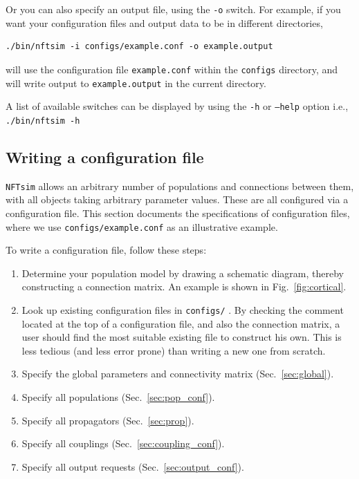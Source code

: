 \documentclass[12pt,a4paper]{article}
\newcommand{\type}[1]{{\small\small\tt #1} }
\newcommand{\NF}[0]{\type{NFTsim}}
\begin{document}
Or you can also specify an output file, using the \type{-o} switch. For example, if you want your configuration files and output data to be in different directories,

\begin{lstlisting}
./bin/nftsim -i configs/example.conf -o example.output
\end{lstlisting}

will use the configuration file \type{example.conf} within the \type{configs} directory, and will write output to \type{example.output} in the current directory.

A list of available switches can be displayed by using the \type{-h} or \type{--help} option i.e., \type{./bin/nftsim -h}

\subsection{Writing a configuration file}
\label{sec:config}

\NF allows an arbitrary number of populations and connections between them, with all objects taking arbitrary parameter values. These are all configured via a configuration file. This section documents the specifications of configuration files, where we use \type{configs/example.conf} as an illustrative example.

To write a configuration file, follow these steps:
\begin{enumerate}
\item Determine your population model by drawing a schematic diagram, thereby constructing a connection matrix. An example is shown in Fig.~\ref{fig:cortical}.
\item Look up existing configuration files in \type{configs/}. By checking the comment located at the top of a configuration file, and also the connection matrix, a user should find the most suitable existing file to construct his own. This is less tedious (and less error prone) than writing a new one from scratch.
\item Specify the global parameters and connectivity matrix (Sec.~\ref{sec:global}).
\item Specify all populations (Sec.~\ref{sec:pop_conf}).
\item Specify all propagators (Sec.~\ref{sec:prop}).
\item Specify all couplings (Sec.~\ref{sec:coupling_conf}).
\item Specify all output requests (Sec.~\ref{sec:output_conf}).
\end{enumerate}
\end{document}
